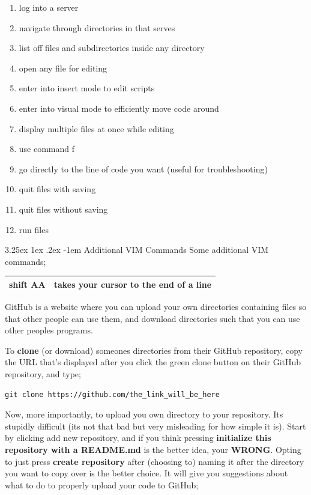 \documentclass{article}
\makeatletter
\newcounter{subsubsubsection}[subsubsection]
\renewcommand\subparagraph{\@startsection{subparagraph}{6}{\parindent}%
  {3.25ex \@plus1ex \@minus .2ex}%
  {-1em}%
  {\normalfont\normalsize\bfseries}}
\makeatother
\begin{document}
\begin{enumerate}
   \item log into a server
   \item navigate through directories in that serves
   \item list off files and subdirectories inside any directory
   \item open any file for editing
   \item enter into insert mode to edit scripts 
   \item enter into visual mode to efficiently move code around 
   \item display multiple files at once while editing
   \item use command f 
   \item go directly to the line of code you want (useful for troubleshooting)
   \item quit files with saving
   \item quit files without saving 
   \item run files
\end{enumerate}

\subparagraph{Additional VIM Commands}
Some additional VIM commands; 

\begin{center}
\begin{tabular*}{\textwidth}{ | p{} | p{}| }
\hline
\textbf{shift AA} & takes your cursor to the end of a line \\
\hline
\end{tabular*}
\end{center}

GitHub is a website where you can upload your own directories containing files so that other people can use them, and download directories such that you can use other peoples programs. 

To \textbf{clone} (or download) someones directories from their GitHub repository, copy the URL that's displayed after you click the green clone button on their GitHub repository, and type;

\texttt{git clone https://github.com/the\_link\_will\_be\_here}

Now, more importantly, to upload you own directory to your repository. Its stupidly difficult (its not that bad but very misleading for how simple it is). Start by clicking add new repository, and if you think pressing \textbf{initialize this repository with a README.md} is the better idea, your \textbf{WRONG}. Opting to just press \textbf{create repository} after (choosing to) naming it after the directory you want to copy over is the better choice. It will give you suggestions about what to do to properly upload your code to GitHub;
\end{document}
